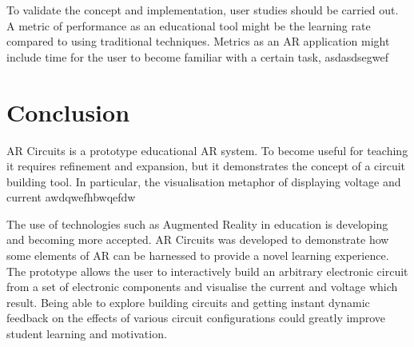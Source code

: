 To validate the concept and implementation, user studies should be carried out. A metric of performance as an educational tool might be the learning rate compared to using traditional techniques. Metrics as an AR application might include time for the user to become familiar with a certain task, asdasdsegwef

\section{Conclusion}

AR Circuits is a prototype educational AR system. To become useful for teaching it requires refinement and expansion, but it demonstrates the concept of a circuit building tool. In particular, the visualisation metaphor of displaying voltage and current awdqwefhbwqefdw

The use of technologies such as Augmented Reality in education is developing and becoming more accepted. AR Circuits was developed to demonstrate how some elements of AR can be harnessed to provide a novel learning experience. The prototype allows the user to interactively build an arbitrary electronic circuit from a set of electronic components and visualise the current and voltage which result. Being able to explore building circuits and getting instant dynamic feedback on the effects of various circuit configurations could greatly improve student learning and motivation.








